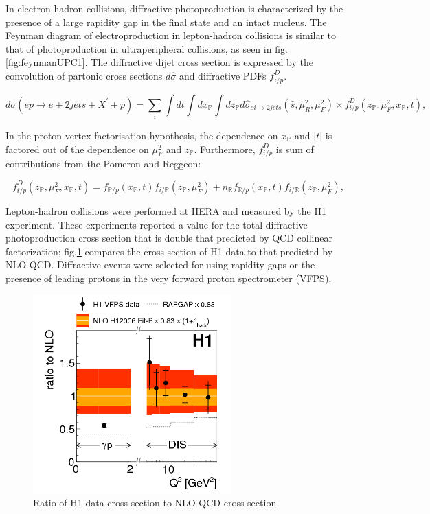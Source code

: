 In electron-hadron collisions, diffractive photoproduction is characterized by the presence of a large rapidity gap in the final state and an intact nucleus. The Feynman diagram of electroproduction in lepton-hadron collisions is similar to that of photoproduction in ultraperipheral collisions, as seen in fig.\ref{fig:feynmanUPC1}. The diffractive dijet cross section is expressed by the convolution of partonic cross sections $d\hat{\sigma}$ and diffractive PDFs $f^D_{i/p}$.

\begin{equation}
d\sigma (ep \rightarrow e + 2 jets + X^{'} + p) = \sum_{i} \int dt \int dx_\mathbb{P} \int dz_\mathbb{P} d\hat{\sigma}_{ei\rightarrow 2jets}(\hat{s},\mu^2_R,\mu^2_F)\times f^D_{i/p}(z_\mathbb{P},\mu^2_F,x_\mathbb{P},t) ,
\end{equation}

In the proton-vertex factorisation hypothesis, the dependence on $x_{\mathbb{P}}$ and $|t|$ is factored out of the dependence on $\mu^2_F$ and $z_{\mathbb{P}}$. Furthermore, $f^D_{i/p}$ is sum of contributions from the Pomeron and Reggeon:

\begin{equation}
f^D_{i/p}(z_{\mathbb{P}},\mu^2_F,x_{\mathbb{P}},t) = f_{\mathbb{P}/p}(x_{\mathbb{P}},t)f_{i/\mathbb{P}}(z_{\mathbb{P}},\mu^2_F) + n_\mathbb{R}f_{\mathbb{R}/p}(x_{\mathbb{P}},t)f_{i/\mathbb{R}}(z_{\mathbb{P}},
\mu^2_F) ,
\end{equation}

Lepton-hadron collisions were performed at HERA and measured by the H1 experiment. These experiments reported a value for the total diffractive photoproduction cross section that is double that predicted by QCD collinear factorization; fig.\ref{fig:h1Ratio} compares the cross-section of H1 data to that predicted by NLO-QCD. Diffractive events were selected for using rapidity gaps or the presence of leading protons in the very forward proton spectrometer (VFPS). 

\begin{figure}[h!]
\begin{centering}
\includegraphics[width=3in]{Chapter2/importfigs/fig8_h1_2015.png}
\par\end{centering}
\caption{Ratio of H1 data cross-section to NLO-QCD cross-section \label{fig:h1Ratio}}
\end{figure}

